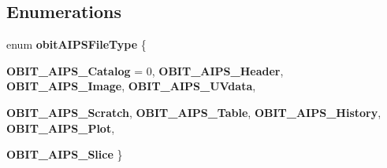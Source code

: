 \subsection*{Enumerations}
\begin{CompactItemize}
\item 
enum {\bf obit\-AIPSFile\-Type} \{ \par
{\bf OBIT\_\-AIPS\_\-Catalog} =  0, 
{\bf OBIT\_\-AIPS\_\-Header}, 
{\bf OBIT\_\-AIPS\_\-Image}, 
{\bf OBIT\_\-AIPS\_\-UVdata}, 
\par
{\bf OBIT\_\-AIPS\_\-Scratch}, 
{\bf OBIT\_\-AIPS\_\-Table}, 
{\bf OBIT\_\-AIPS\_\-History}, 
{\bf OBIT\_\-AIPS\_\-Plot}, 
\par
{\bf OBIT\_\-AIPS\_\-Slice}
 \}
\begin{CompactList}\small\item\em \item\end{CompactList}\end{CompactItemize}
